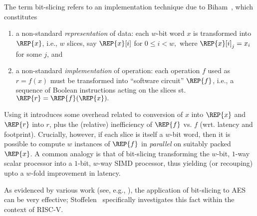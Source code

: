 The term bit-slicing refers to an implementation technique due to
Biham~\cite{Biham:97},
which constitutes

\begin{enumerate}
\item a non-standard {\em representation}
      of data:
      each $w$-bit word $x$ is transformed into $\REP{x}$,
      i.e.,
      $w$ slices, say $\REP{x}[ i ]$ for
      $
      0 \leq i < w ,
      $
      where $\REP{x}[ i ]_j = x_i$ for some $j$,
      and
\item a non-standard {\em implementation}
      of operation:
      each operation $f$ used as
      $
          {r} =     {f}(     {x} )
      $
      must be transformed into ``software circuit'' $\REP{f}$,
      i.e.,
      a sequence of Boolean instructions acting on the slices st.
      $
      \REP{r} = \REP{f}( \REP{x} ) .
      $
\end{enumerate}

\noindent
Using it introduces some overhead related to conversion of $x$ into
$\REP{x}$ and $\REP{r}$ into $r$, plus the (relative) inefficiency
of $\REP{f}$ vs. $f$ (wrt. latency and footprint).
Crucially, however, if each slice is itself a $w$-bit word, then it
is possible to compute $w$ instances of $\REP{f}$ in {\em parallel}
on suitably packed $\REP{x}$.
A common analogy is that of bit-slicing transforming the 
$w$-bit, $1$-way scalar processor 
into a 
$1$-bit, $w$-way SIMD   processor, 
thus yielding (or recouping) upto a $w$-fold improvement in latency.

As evidenced by various work
(see, e.g., \cite{MatNak:07,Konighofer:08,KasSch:09}),
the application of bit-slicing to AES can be very effective;
Stoffelen~\cite[Section 3.1]{Stoffelen:19}
specifically investigates this fact within the context of RISC-V.

